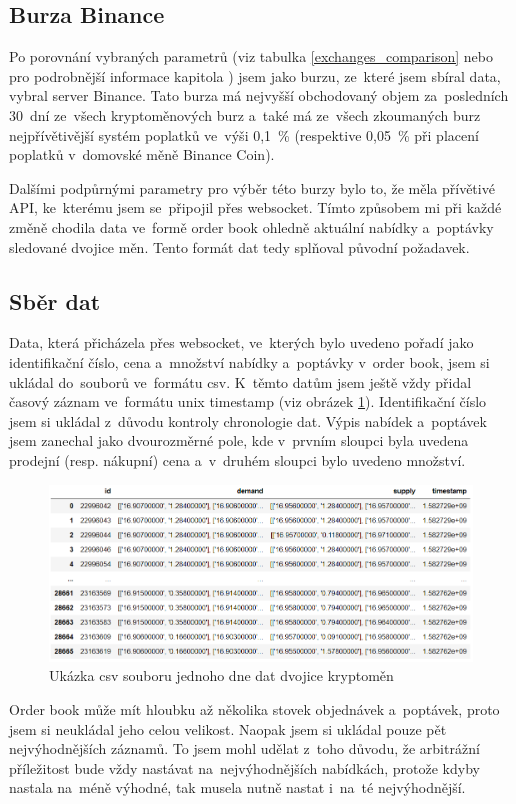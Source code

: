 \documentclass[thesis=B,czech]{FITthesis}[2019/03/21]
\begin{document}
\subsection{Burza Binance}
Po porovnání vybraných parametrů (viz tabulka \ref{exchanges_comparison} nebo pro podrobnější informace kapitola ) jsem jako burzu, ze~které jsem sbíral data, vybral server Binance. Tato burza má nejvyšší obchodovaný objem za~posledních 30~dní ze~všech kryptoměnových burz \cite{coinmarketcap} a~také má ze~všech zkoumaných burz nejpřívětivější systém poplatků ve~výši 0,1~\% (respektive 0,05~\% při placení poplatků v~domovské měně Binance Coin).

Dalšími podpůrnými parametry pro výběr této burzy bylo to, že měla přívětivé API, ke~kterému jsem se~připojil přes websocket. \cite{BinanceApi} Tímto způsobem mi při každé změně chodila data ve~formě order book ohledně aktuální nabídky a~poptávky sledované dvojice měn. Tento formát dat tedy splňoval původní požadavek. \cite{BinanceApi}

\subsection{Sběr dat}
Data, která přicházela přes websocket, ve~kterých bylo uvedeno pořadí jako identifikační číslo, cena a~množství nabídky a~poptávky v~order book, jsem si ukládal do~souborů ve~formátu csv. K~těmto datům jsem ještě vždy přidal časový záznam ve~formátu unix timestamp (viz obrázek \ref{csv_data}). Identifikační číslo jsem si ukládal z~důvodu kontroly chronologie dat. Výpis nabídek a~poptávek jsem zanechal jako dvourozměrné pole, kde v~prvním sloupci byla uvedena prodejní (resp. nákupní) cena a~v~druhém sloupci bylo uvedeno množství.

\begin{figure}\centering
	\includegraphics[width=1\textwidth]{images/csv_data.PNG}
	\caption{Ukázka csv souboru jednoho dne dat dvojice kryptoměn}\label{csv_data}
\end{figure}
Order book může mít hloubku až několika stovek objednávek a~poptávek, proto jsem si neukládal jeho celou velikost. Naopak jsem si ukládal pouze pět nejvýhodnějších záznamů. To jsem mohl udělat z~toho důvodu, že arbitrážní příležitost bude vždy nastávat na~nejvýhodnějších nabídkách, protože kdyby nastala na~méně výhodné, tak musela nutně nastat i~na~té nejvýhodnější. 
\end{document}
